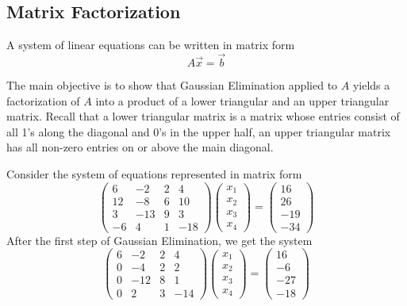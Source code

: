 \subsection{Matrix Factorization}
A system of linear equations can be written in matrix form
\[
A\vec{x} = \vec{b}
\]

The main objective is to show that Gaussian Elimination applied to \(A\) yields a factorization of \(A\) into a product of a lower triangular and an upper triangular matrix. Recall that a lower triangular matrix is a matrix whose entries consist of all 1's along the diagonal and 0's in the upper half, an upper triangular matrix has all non-zero entries on or above the main diagonal.
\begin{example}
  Consider the system of equations represented in matrix form
  \[
  \begin{pmatrix}
    6 & -2 & 2 & 4\\
    12 & -8 & 6 & 10\\
    3 & -13 & 9 & 3\\
    -6 & 4 & 1 & -18
  \end{pmatrix}
  \begin{pmatrix}
    x_{1}\\
    x_{2}\\
    x_{3}\\
    x_{4}
  \end{pmatrix}
=
  \begin{pmatrix}
    16\\
    26\\
    -19\\
    -34
  \end{pmatrix}
  \]
  After the first step of Gaussian Elimination, we get the system
  \[
  \begin{pmatrix}
    6 & -2 & 2 & 4\\
    0 & -4 & 2 & 2\\
    0 & -12 & 8 & 1\\
    0 & 2 & 3 & -14
  \end{pmatrix}
  \begin{pmatrix}
    x_{1}\\
    x_{2}\\
    x_{3}\\
    x_{4}
  \end{pmatrix}
=
  \begin{pmatrix}
    16\\
    -6\\
    -27\\
    -18
  \end{pmatrix}
\]
\end{example}
